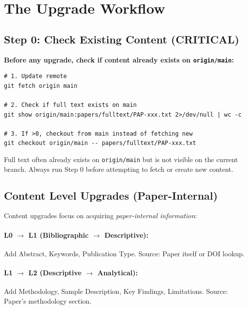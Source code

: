 
\section{The Upgrade Workflow}
\label{sec:paperint-upgrade}

\subsection{Step 0: Check Existing Content (CRITICAL)}

\textbf{Before any upgrade, check if content already exists on \texttt{origin/main}:}

\begin{verbatim}
# 1. Update remote
git fetch origin main

# 2. Check if full text exists on main
git show origin/main:papers/fulltext/PAP-xxx.txt 2>/dev/null | wc -c

# 3. If >0, checkout from main instead of fetching new
git checkout origin/main -- papers/fulltext/PAP-xxx.txt
\end{verbatim}

\begin{tcolorbox}[colback=yellow!10!white, colframe=yellow!75!black,
    title=Learning INT-L-002: Always Check Main First]
Full text often already exists on \texttt{origin/main} but is not visible on
the current branch. Always run Step 0 before attempting to fetch or create
new content.
\end{tcolorbox}

\subsection{Content Level Upgrades (Paper-Internal)}

Content upgrades focus on acquiring \textit{paper-internal information}:

\paragraph{L0 $\rightarrow$ L1 (Bibliographic $\rightarrow$ Descriptive):}
Add Abstract, Keywords, Publication Type. Source: Paper itself or DOI lookup.

\paragraph{L1 $\rightarrow$ L2 (Descriptive $\rightarrow$ Analytical):}
\label{sec:upgrade-l2}
Add Methodology, Sample Description, Key Findings, Limitations. Source: Paper's methodology section.

